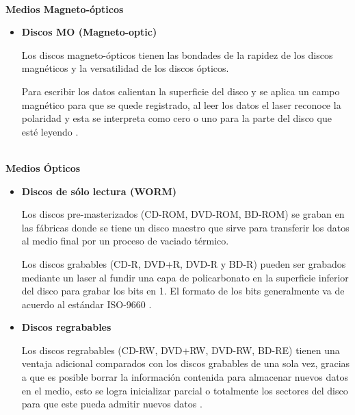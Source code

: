 \textbf{\\ Medios Magneto-\'{o}pticos \\}

\begin{itemize}

  \item \textbf{Discos MO (Magneto-optic)}
  
  Los discos magneto-\'{o}pticos tienen las bondades de la rapidez de los discos magn\'{e}ticos y la versatilidad de los discos \'{o}pticos.
  
  Para escribir los datos calientan la superficie del disco y se aplica un campo magn\'{e}tico para que se quede registrado, al leer los datos el laser reconoce la polaridad y esta se interpreta como cero o uno para la parte del disco que est\'{e} leyendo \cite{_illustrated_????}.
 
\end{itemize}

\textbf{\\ Medios \'{O}pticos \\}


\begin{itemize}

  \item \textbf{Discos de s\'{o}lo lectura (WORM)}
  
  Los discos pre-masterizados (CD-ROM, DVD-ROM, BD-ROM) se graban en las f\'{a}bricas donde se tiene un disco maestro que sirve para transferir los datos al medio final por un proceso de vaciado t\'{e}rmico.
  
  Los discos grabables (CD-R, DVD+R, DVD-R y BD-R) pueden ser grabados mediante un laser al fundir una capa de policarbonato en la superficie inferior del disco para grabar los bits en 1. El formato de los bits generalmente va de acuerdo al est\'{a}ndar ISO-9660 \cite{_further_????}.
  
  \item \textbf{Discos regrabables}
  
  Los discos regrabables (CD-RW, DVD+RW, DVD-RW, BD-RE) tienen una ventaja adicional comparados con los discos grabables de una sola vez, gracias a que es posible borrar la informaci\'{o}n contenida para almacenar nuevos datos en el medio, esto se logra inicializar parcial o totalmente los sectores del disco para que este pueda admitir nuevos datos \cite{_odd_????}.
  
\end{itemize}

